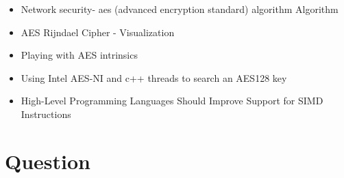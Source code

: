 \documentclass{article}
\begin{document}
\begin{enumerate}[label=\alph*]
\begin{itemize}
\item Network  security-  aes  (advanced  encryption  standard)  algorithm Algorithm \citep{aes_utube_sundeep}


\item AES Rijndael Cipher - Visualization \citep{aes_utube_flash}

\item Playing with AES intrinsics \citep{vincent_intrinsics}


\item Using Intel AES-NI and c++ threads to search an AES128 key \citep{aes_github}

\item High-Level Programming Languages Should Improve Support for SIMD Instructions \citep{gaston_simd}

\end{itemize}

\end{enumerate}


\section{Question}
\end{document}
